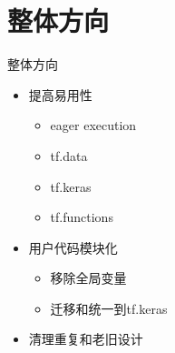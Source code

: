 
\section{整体方向}

\begin{frame}{整体方向}
    \begin{itemize}
        \item 提高易用性
            \begin{itemize}
                \item eager execution
                \item tf.data
                \item tf.keras
                \item tf.functions
            \end{itemize}
        \item 用户代码模块化
            \begin{itemize}
                \item 移除全局变量
                \item 迁移和统一到tf.keras
            \end{itemize}
        \item 清理重复和老旧设计
    \end{itemize}
\end{frame}
